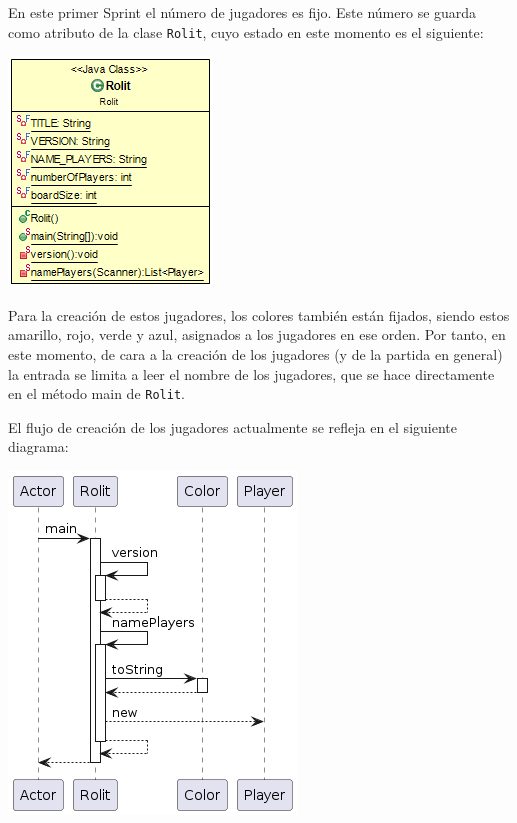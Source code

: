 \documentclass[../DocumentoOficial.tex]{subfiles}
\begin{document}
\begin{sprint}[1]
En este primer Sprint el número de jugadores es fijo. Este número se guarda como atributo de la clase \texttt{Rolit}, cuyo estado en este momento es el siguiente:

\begin{center}
\includegraphics[scale=0.85]{Rolit-sprint1.png} 
\end{center}

Para la creación de estos jugadores, los colores también están fijados, siendo estos amarillo, rojo, verde y azul, asignados a los jugadores en ese orden. Por tanto, en este momento, de cara a la creación de los jugadores (y de la partida en general) la entrada se limita a leer el nombre de los jugadores, que se hace directamente en el método main de \texttt{Rolit}.

El flujo de creación de los jugadores actualmente se refleja en el siguiente diagrama:

\begin{center}
\includegraphics[scale=0.85]{Rolit.main()-sprint1.png} 
\end{center}

\end{sprint}
\end{document}
